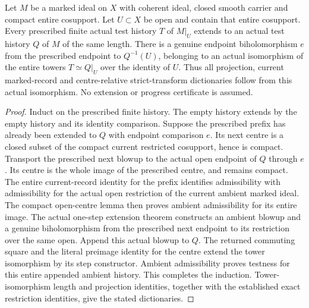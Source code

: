 \begin{theorem}
\label{hir:compact-cosupport-open-tower-extension}
\leanok
Let $M$ be a marked ideal on $X$ with coherent ideal, closed smooth carrier and compact entire cosupport. Let $U\subset X$ be open and contain that entire cosupport. Every prescribed finite actual test history $T$ of $M|_U$ extends to an actual test history $Q$ of $M$ of the same length. There is a genuine endpoint biholomorphism $e$ from the prescribed endpoint to $Q^{-1}(U)$, belonging to an actual isomorphism of the entire towers $T\simeq Q|_U$ over the identity of $U$. Thus all projection, current marked-record and centre-relative strict-transform dictionaries follow from this actual isomorphism. No extension or progress certificate is assumed.
\end{theorem}
\begin{proof}
Induct on the prescribed finite history. The empty history extends by the empty history and its identity comparison. Suppose the prescribed prefix has already been extended to $Q$ with endpoint comparison $e$. Its next centre is a closed subset of the compact current restricted cosupport, hence is compact. Transport the prescribed next blowup to the actual open endpoint of $Q$ through $e$. Its centre is the whole image of the prescribed centre, and remains compact. The entire current-record identity for the prefix identifies admissibility with admissibility for the actual open restriction of the current ambient marked ideal. The compact open-centre lemma then proves ambient admissibility for its entire image. The actual one-step extension theorem constructs an ambient blowup and a genuine biholomorphism from the prescribed next endpoint to its restriction over the same open. Append this actual blowup to $Q$. The returned commuting square and the literal preimage identity for the centre extend the tower isomorphism by its step constructor. Ambient admissibility proves testness for this entire appended ambient history. This completes the induction. Tower-isomorphism length and projection identities, together with the established exact restriction identities, give the stated dictionaries.
\end{proof}

